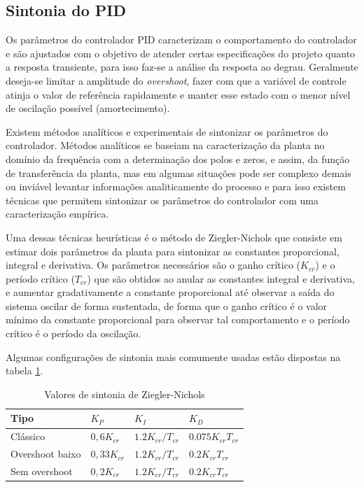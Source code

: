 \subsection{Sintonia do PID}

Os parâmetros do controlador PID caracterizam o comportamento do controlador e são ajustados com o objetivo de atender certas especificações do projeto quanto a resposta transiente, para isso faz-se a análise da resposta ao degrau. Geralmente deseja-se limitar a amplitude do \textit{overshoot}, fazer com que a variável de controle atinja o valor de referência rapidamente e manter esse estado com o menor nível de oscilação possível (amortecimento). 

Existem métodos analíticos e experimentais de sintonizar os parâmetros do controlador. Métodos analíticos se baseiam na caracterização da planta no domínio da frequência com a determinação dos polos e zeros, e assim, da função de transferência da planta, mas em algumas situações pode ser complexo demais ou inviável levantar informações analiticamente do processo e para isso existem técnicas que permitem sintonizar os parâmetros do controlador com uma caracterização empírica.

Uma dessas técnicas heurísticas é o método de Ziegler-Nichols que consiste em estimar dois parâmetros da planta para sintonizar as constantes proporcional, integral e derivativa. Os parâmetros necessários são o ganho crítico ($K_{cr}$) e o período crítico ($T_{cr}$) que são obtidos ao anular as constantes integral e derivativa, e aumentar gradativamente a constante proporcional até observar a saída do sistema oscilar de forma sustentada, de forma que o ganho crítico é o valor mínimo da constante proporcional para observar tal comportamento e o período crítico é o período da oscilação.

Algumas configurações de sintonia mais comumente usadas estão dispostas na tabela \ref{ZN}.

\begin{table}[htb]
    \centering
    \caption{Valores de sintonia de Ziegler-Nichols}
    \label{ZN}
    \begin{tabular}{llll}
    \hline
    Tipo            & $K_P$        & $K_I$            & $K_D$            \\ 
    \hline \hline
    Clássico        & $0,6K_{cr}$  & $1.2K_{cr}/T_{cr}$ & $0.075K_{cr}T_{cr}$ \\ 
    \hline
    Overshoot baixo & $0,33K_{cr}$ & $1.2K_{cr}/T_{cr}$ & $0.2K_{cr}T_{cr}$ \\ 
    \hline
    Sem overshoot   & $0,2K_{cr}$  & $1.2K_{cr}/T_{cr}$ & $0.2K_{cr}T_{cr}$ \\
    \hline
    \end{tabular}
\end{table}
